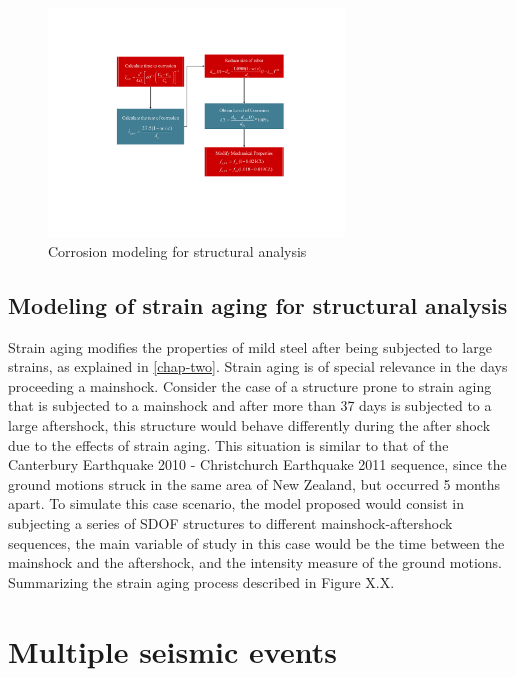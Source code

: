 \begin{figure}[htbp]
	\centering
	\includegraphics[width=0.7\textwidth]{Chapter-4/figs/Corrosion_Modeling}
	\caption{Corrosion modeling for structural analysis}
	\label{fig:CorrModel}
\end{figure}
\subsection{Modeling of strain aging for structural analysis}
Strain aging modifies the properties of mild steel after being subjected to large strains, as explained in \ref{chap-two}. Strain aging is of special relevance in the days proceeding a mainshock. Consider the case of a structure prone to strain aging that is subjected to a mainshock and after more than 37 days is subjected to a large aftershock, this structure would behave differently during the after shock due to the effects of strain aging. This situation is similar to that of the Canterbury Earthquake 2010 - Christchurch Earthquake 2011 sequence, since the ground motions struck in the same area of New Zealand, but occurred 5 months apart. To simulate this case scenario, the model proposed would consist in subjecting a series of SDOF structures to different mainshock-aftershock sequences, the main variable of study in this case would be the time between the mainshock and the aftershock, and the intensity measure of the ground motions. Summarizing the strain aging process described in Figure X.X. 

\section{Multiple seismic events}

